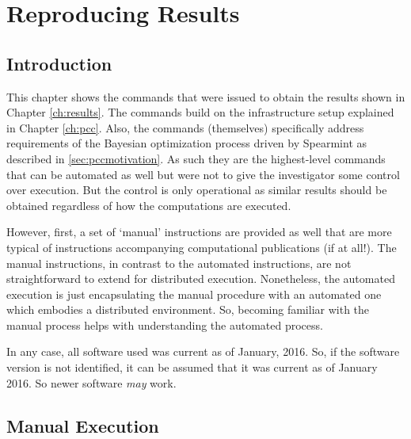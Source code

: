 \chapter{Reproducing Results}
\label{ch:reproduce}



\section{Introduction}


This chapter shows the commands that were issued to obtain the results shown in Chapter \ref{ch:results}.
% 
The commands build on the infrastructure setup explained in Chapter \ref{ch:pcc}.
% 
Also, the commands (themselves) specifically address requirements of the Bayesian optimization process driven by \textsf{Spearmint} as described in \ref{sec:pccmotivation}.
% 
As such they are the highest-level commands that can be automated as well but were not to give the investigator some control over execution.
% 
But the control is only operational as similar results should be obtained regardless of how the computations are executed.


However, first, a set of `manual' instructions are provided as well that are more typical of instructions accompanying computational publications (if at all!).
% 
The manual instructions, in contrast to the automated instructions, are not straightforward to extend for distributed execution.
% 
Nonetheless, the automated execution is just encapsulating the manual procedure with an automated one which embodies a distributed environment.
%
So, becoming familiar with the manual process helps with understanding the automated process.


In any case, all software used was current as of January, 2016.
% 
So, if the software version is not identified, it can be assumed that it was current as of January 2016.
% 
So newer software \emph{may} work.



\section{Manual Execution}
\label{sec:manual}


